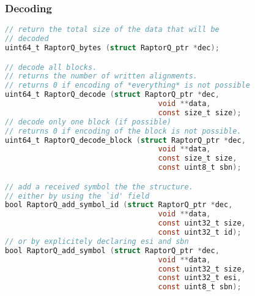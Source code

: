 \documentclass[11pt,a4paper]{refart}
\begin{document}
\subsubsection{Decoding}
\begin{lstlisting}[language=C]
// return the total size of the data that will be
// decoded
uint64_t RaptorQ_bytes (struct RaptorQ_ptr *dec);

// decode all blocks.
// returns the number of written alignments.
// returns 0 if encoding of *everything* is not possible
uint64_t RaptorQ_decode (struct RaptorQ_ptr *dec,
                                   void **data,
                                   const size_t size);
// decode only one block (if possible)
// returns 0 if encoding of the block is not possible.
uint64_t RaptorQ_decode_block (struct RaptorQ_ptr *dec,
                                   void **data,
                                   const size_t size,
                                   const uint8_t sbn);

// add a received symbol the the structure.
// either by using the `id' field
bool RaptorQ_add_symbol_id (struct RaptorQ_ptr *dec,
                                   void **data,
                                   const uint32_t size,
                                   const uint32_t id);
// or by explicitely declaring esi and sbn
bool RaptorQ_add_symbol (struct RaptorQ_ptr *dec,
                                   void **data,
                                   const uint32_t size,
                                   const uint32_t esi,
                                   const uint8_t sbn);
\end{lstlisting}





\printindex
\end{document}
